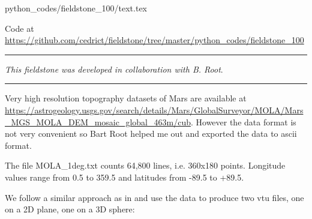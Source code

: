 \begin{flushright} {\tiny {\color{gray} python\_codes/fieldstone\_100/text.tex}} \end{flushright}



\begin{center}
Code at \url{https://github.com/cedrict/fieldstone/tree/master/python_codes/fieldstone_100}
\end{center}

\par\noindent\rule{\textwidth}{0.4pt}

{\sl This fieldstone was developed in collaboration with B. Root}. 

\par\noindent\rule{\textwidth}{0.4pt}

Very high resolution topography datasets of Mars are available at 
\url{https://astrogeology.usgs.gov/search/details/Mars/GlobalSurveyor/MOLA/Mars_MGS_MOLA_DEM_mosaic_global_463m/cub}.
However the data format is not very convenient so Bart Root 
helped me out and exported the data to ascii format.

The file {\filenamefont MOLA\_1deg.txt} counts 64,800 lines, i.e. 360x180 points. Longitude values range from  
0.5 to 359.5 and latitudes from -89.5 to +89.5. 

We follow a similar approach as in  and use the data to produce 
two vtu files, one on a 2D plane, one on a 3D sphere:

